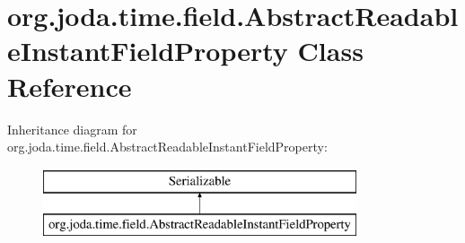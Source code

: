 \hypertarget{classorg_1_1joda_1_1time_1_1field_1_1_abstract_readable_instant_field_property}{\section{org.\-joda.\-time.\-field.\-Abstract\-Readable\-Instant\-Field\-Property Class Reference}
\label{classorg_1_1joda_1_1time_1_1field_1_1_abstract_readable_instant_field_property}
}
Inheritance diagram for org.\-joda.\-time.\-field.\-Abstract\-Readable\-Instant\-Field\-Property\-:\begin{figure}[H]
\begin{center}
\leavevmode
\includegraphics[height=2.000000cm]{classorg_1_1joda_1_1time_1_1field_1_1_abstract_readable_instant_field_property}
\end{center}
\end{figure}
